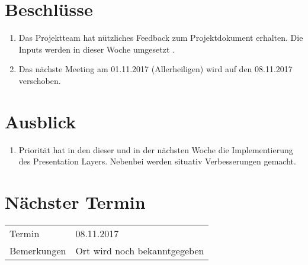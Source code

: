 \documentclass[11pt, a4paper,oneside]{scrartcl}
\begin{document}
\section{Beschlüsse}
\begin{enumerate}
	\item Das Projektteam hat nützliches Feedback zum Projektdokument erhalten. Die Inputs werden in dieser Woche umgesetzt . 
	\item Das nächste Meeting am 01.11.2017 (Allerheiligen) wird auf den 08.11.2017 verschoben.
\end{enumerate}

\section{Ausblick}
\begin{enumerate}
	\item Priorität hat in den dieser und in der nächsten Woche die Implementierung des Presentation Layers. Nebenbei werden situativ Verbesserungen gemacht. 
\end{enumerate}

\section{Nächster Termin}
\begin{tabu} to \linewidth {l X }
	\toprule
	Termin & 08.11.2017  \\
	Bemerkungen & Ort wird noch bekanntgegeben   \\
	\bottomrule
\end{tabu}
\end{document}
